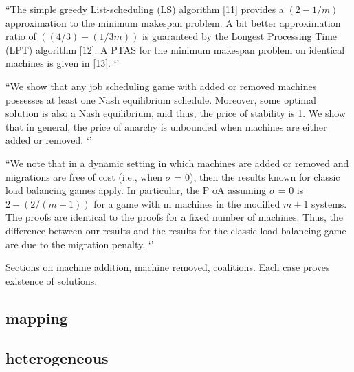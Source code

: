 \documentclass{article}
\begin{document}
``The simple greedy List-scheduling (LS) algorithm [11] provides a $(2 - 1/m)$approximation to the minimum makespan problem. A bit better approximation ratio of  $((4/3) - (1/3m))$ is guaranteed by the Longest Processing Time (LPT) algorithm [12]. A PTAS for the minimum makespan problem on identical machines is given in [13]. ‘’

``We show that any job scheduling game with added or removed machines possesses at least one Nash equilibrium schedule. Moreover, some optimal solution is also a Nash equilibrium, and thus, the price of stability is 1. We show that in general, the price of anarchy is unbounded when machines are either added or removed. ‘’

``We note that in a dynamic setting in which machines are added or removed and migrations 
are free of cost (i.e., when $\sigma$ = 0), then the results known for classic load balancing games apply.   In particular, the P oA assuming $\sigma$ = 0 is $2 - (2 / (m+1))$ for a game with m machines in the modified $m+1$  systems. The proofs are identical to the proofs for a fixed number of machines. Thus, the difference between our results and the results for the classic load balancing game are due to the migration penalty. ‘’

Sections on machine addition, machine removed, coalitions.  Each case proves existence of solutions.




\cite{BARAM2014241}














\subsection{mapping}

\cite{doi:10.1137/0611030}
\cite{4227986}
\cite{doi:10.1142/S0129054197000215}
\cite{Sbirlea:2014:BMS:2628071.2628090}

\subsection{heterogeneous}

\cite{Flegar:2017:OLI:3149704.3149767}
\cite{8082085}
\cite{7993387}
\cite{Cederman:2008:DLB:1413957.1413967}
\cite{10.1007/978-981-10-6442-5_56}
\cite{dlbgraphgpu}
\end{document}
